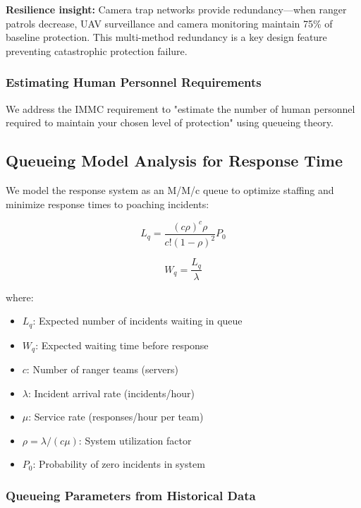 \noindent \textbf{Resilience insight:} Camera trap networks provide redundancy—when ranger patrols decrease, UAV surveillance and camera monitoring maintain 75\% of baseline protection. This multi-method redundancy is a key design feature preventing catastrophic protection failure.

\subsubsection{Estimating Human Personnel Requirements}

We address the IMMC requirement to "estimate the number of human personnel required to maintain your chosen level of protection" using queueing theory.

\subsection{Queueing Model Analysis for Response Time}

We model the response system as an M/M/c queue to optimize staffing and minimize response times to poaching incidents:

\begin{equation}
L_q = \frac{(c\rho)^c \rho}{c!(1-\rho)^2} P_0
\label{eq:queue_length}
\end{equation}

\begin{equation}
W_q = \frac{L_q}{\lambda}
\label{eq:waiting_time}
\end{equation}

where:
\begin{itemize}
    \item $L_q$: Expected number of incidents waiting in queue
    \item $W_q$: Expected waiting time before response
    \item $c$: Number of ranger teams (servers)
    \item $\lambda$: Incident arrival rate (incidents/hour)
    \item $\mu$: Service rate (responses/hour per team)
    \item $\rho = \lambda/(c\mu)$: System utilization factor
    \item $P_0$: Probability of zero incidents in system
\end{itemize}

\subsubsection{Queueing Parameters from Historical Data}

